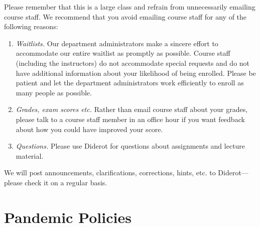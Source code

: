 \begin{gram}
  Please remember that
    this is a large class and refrain from unnecessarily emailing
    course staff.  We recommend that you avoid emailing course staff
    for any of the following reasons:
  
\begin{enumerate}
\item \emph{Waitlists.} Our department administrators make a sincere
  effort to accommodate our entire waitlist as promptly as possible.
  Course staff (including the instructors) do not accommodate special
  requests and do not have additional information about your
  likelihood of being enrolled.  Please be patient and let the
  department administrators work efficiently to enroll as many people
  as possible.

\item \emph{Grades, exam scores etc.} Rather than email course staff
  about your grades, please talk to a course staff member in an office
  hour if you want feedback about how you could have improved your
  score.


\item \emph{Questions.} Please use Diderot for questions about
  assignments and lecture material.
\end{enumerate}

    We will post announcements, clarifications, corrections, hints, etc. to
    Diderot---please check it on a regular basis. 
  \end{gram}
  

\section{Pandemic Policies}



